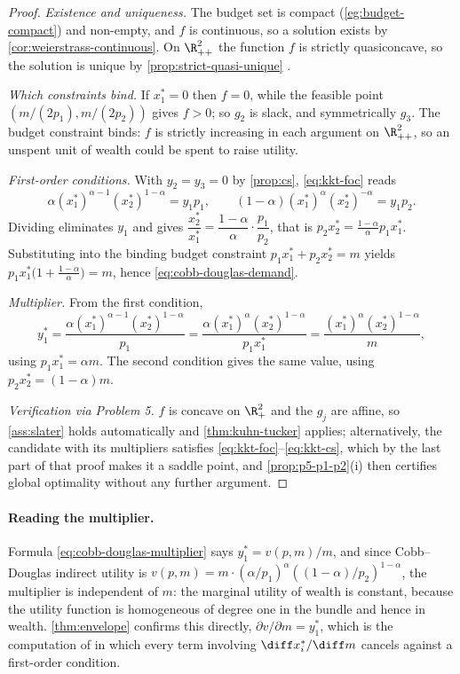 \begin{proof}
	\emph{Existence and uniqueness.} The budget set is compact
	(\autoref{eg:budget-compact}) and non-empty, and $f$ is continuous, so a
	solution exists by \autoref{cor:weierstrass-continuous}. On $\R^2_{++}$ the
	function $f$ is strictly quasiconcave, so the solution is unique by
	\autoref{prop:strict-quasi-unique}
	\autocite[slide 21]{fukuda2026optimization}.

	\emph{Which constraints bind.} If $x_1^\ast=0$ then $f=0$, while the feasible
	point $(m/(2p_1),m/(2p_2))$ gives $f>0$; so $g_2$ is slack, and symmetrically
	$g_3$. The budget constraint binds: $f$ is strictly increasing in each argument
	on $\R^2_{++}$, so an unspent unit of wealth could be spent to raise utility.

	\emph{First-order conditions.} With $y_2=y_3=0$ by \autoref{prop:cs},
	\eqref{eq:kkt-foc} reads
	\[
		\alpha (x_1^\ast)^{\alpha-1}(x_2^\ast)^{1-\alpha}=y_1p_1,
		\qquad
		(1-\alpha)(x_1^\ast)^{\alpha}(x_2^\ast)^{-\alpha}=y_1p_2 .
	\]
	Dividing eliminates $y_1$ and gives
	$\dfrac{x_2^\ast}{x_1^\ast}=\dfrac{1-\alpha}{\alpha}\cdot\dfrac{p_1}{p_2}$,
	that is $p_2x_2^\ast=\frac{1-\alpha}{\alpha}p_1x_1^\ast$. Substituting into the
	binding budget constraint $p_1x_1^\ast+p_2x_2^\ast=m$ yields
	$p_1x_1^\ast\bigl(1+\frac{1-\alpha}{\alpha}\bigr)=m$, hence
	\eqref{eq:cobb-douglas-demand}.

	\emph{Multiplier.} From the first condition,
	\[
		y_1^\ast=\frac{\alpha(x_1^\ast)^{\alpha-1}(x_2^\ast)^{1-\alpha}}{p_1}
		=\frac{\alpha(x_1^\ast)^{\alpha}(x_2^\ast)^{1-\alpha}}{p_1x_1^\ast}
		=\frac{(x_1^\ast)^{\alpha}(x_2^\ast)^{1-\alpha}}{m},
	\]
	using $p_1x_1^\ast=\alpha m$. The second condition gives the same value, using
	$p_2x_2^\ast=(1-\alpha)m$.

	\emph{Verification via Problem 5.} $f$ is concave on $\R^2_+$ and the $g_j$ are
	affine, so \autoref{ass:slater} holds automatically and
	\autoref{thm:kuhn-tucker} applies; alternatively, the candidate with its
	multipliers satisfies \eqref{eq:kkt-foc}--\eqref{eq:kkt-cs}, which by the last
	part of that proof makes it a saddle point, and
	\autoref{prop:p5-p1-p2}(i) then certifies global optimality without any further
	argument.
\end{proof}

\paragraph{Reading the multiplier.} Formula
\eqref{eq:cobb-douglas-multiplier} says $y_1^\ast=v(p,m)/m$, and since Cobb--Douglas
indirect utility is $v(p,m)=m\cdot(\alpha/p_1)^{\alpha}((1-\alpha)/p_2)^{1-\alpha}$,
the multiplier is independent of $m$: the marginal utility of wealth is constant,
because the utility function is homogeneous of degree one in the bundle and hence
in wealth. \autoref{thm:envelope} confirms this directly,
$\partial v/\partial m=y_1^\ast$, which is the computation of
\autocite[slides 28--29]{fukuda2026optimization} in which every term involving
$\diff x_i^\ast/\diff m$ cancels against a first-order condition.

